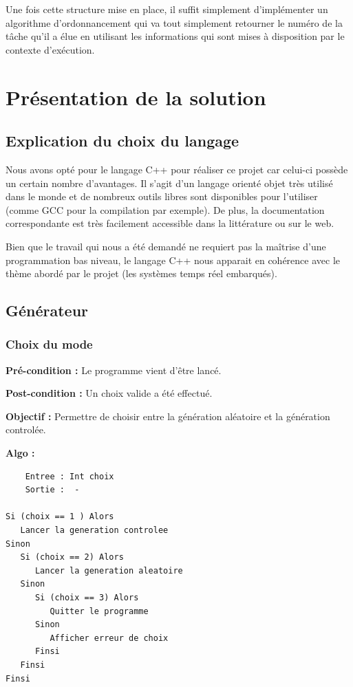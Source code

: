 		Une fois cette structure mise en place, il suffit simplement d'implémenter un algorithme d'ordonnancement qui va tout simplement retourner le numéro de la tâche qu'il a élue en utilisant les informations qui sont mises à disposition par le contexte d'exécution.




\chapter{Présentation de la solution}
	\section{Explication du choix du langage}
		\label{sec:langage}
		Nous avons opté pour le langage C++ pour réaliser ce projet car celui-ci possède un certain nombre d'avantages. Il s'agit d'un langage orienté objet très utilisé dans le monde et de nombreux outils libres sont disponibles pour l'utiliser (comme GCC pour la compilation par exemple). De plus, la documentation correspondante est très facilement accessible dans la littérature ou sur le web.
	
		Bien que le travail qui nous a été demandé ne requiert pas la maîtrise d'une programmation bas niveau, le langage C++ nous apparait en cohérence avec le thème abordé par le projet (les systèmes temps réel embarqués).
		
	\section{Générateur}
		\subsection{Choix du mode}
			\textbf{Pré-condition :} Le programme vient d’être lancé.

			\textbf{Post-condition :} Un choix valide a été effectué.
			
			\textbf{Objectif :} Permettre de choisir entre la génération aléatoire et la génération controlée.
			
			\textbf{Algo :}
			\begin{lstlisting} 
	Entree : Int choix
	Sortie :  -

Si (choix == 1 ) Alors
   Lancer la generation controlee
Sinon
   Si (choix == 2) Alors
	  Lancer la generation aleatoire 
   Sinon
	  Si (choix == 3) Alors
	     Quitter le programme
	  Sinon
	     Afficher erreur de choix 
	  Finsi
   Finsi
Finsi
		\end{lstlisting} 

